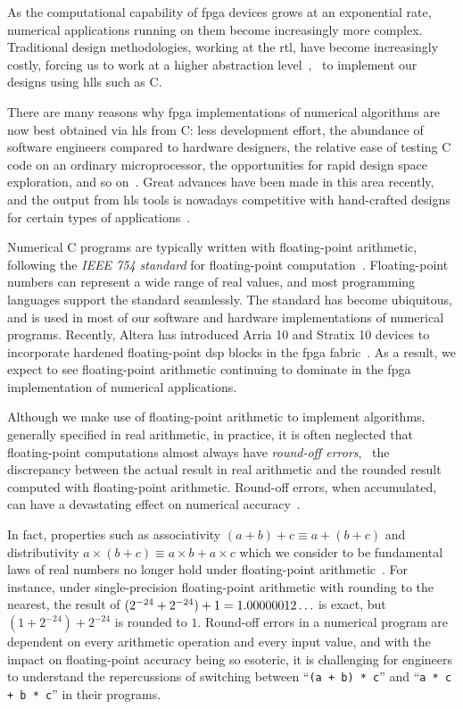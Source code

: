 As the computational capability of \gls{fpga} devices grows at an exponential
rate, numerical applications running on them become increasingly more
complex.  Traditional design methodologies, working at the \gls{rtl}, have
become increasingly costly, forcing us to work at a higher abstraction
level~\cite{gajski, bdti_xilinx, meeus12}, \eg~to implement our designs using
\glspl{hll} such as C\@.

There are many reasons why \gls{fpga} implementations of numerical algorithms
are now best obtained via \gls{hls} from C\@: less development effort, the
abundance of software engineers compared to hardware designers, the relative
ease of testing C code on an ordinary microprocessor, the opportunities
for rapid design space exploration, and so on~\cite{gajski94, meeus12,
nane15}. Great advances have been made in this area recently, and the output
from \gls{hls} tools is nowadays competitive with hand-crafted designs for
certain types of applications~\cite{bdti_xilinx}.

Numerical C programs are typically written with floating-point
arithmetic, following the \emph{IEEE 754 standard} for floating-point
computation~\cite{ieee754}.  Floating-point numbers can represent a wide
range of real values, and most programming languages support the standard
seamlessly.  The standard has become ubiquitous, and is used in most of our
software and hardware implementations of numerical programs.  Recently,
Altera has introduced Arria 10 and Stratix 10 devices to incorporate hardened
floating-point \gls{dsp} blocks in the \gls{fpga} fabric~\cite{stratix10fp}.
As a result, we expect to see floating-point arithmetic continuing to dominate
in the \gls{fpga} implementation of numerical applications.

Although we make use of floating-point arithmetic to implement algorithms,
generally specified in real arithmetic, in practice, it is often neglected that
floating-point computations almost always have \emph{round-off errors}, \ie~the
discrepancy between the actual result in real arithmetic and the rounded result
computed with floating-point arithmetic.  Round-off errors, when accumulated,
can have a devastating effect on numerical accuracy~\cite{higham02}.

In fact, properties such as associativity $(a + b) + c \equiv a + (b +
c)$ and distributivity $a \times (b + c) \equiv a \times b + a \times c$
which we consider to be fundamental laws of real numbers no longer hold
under floating-point arithmetic~\cite{goldberg}.  For instance, under
single-precision floating-point arithmetic with rounding to the nearest, the
result of $(2^{-24} + 2^{-24}) + 1 = 1.00000012\mathellipsis$ is exact, but
$(1 + 2^{-24}) + 2^{-24}$ is rounded to $1$.  Round-off errors in a numerical
program are dependent on every arithmetic operation and every input value, and
with the impact on floating-point accuracy being so esoteric, it is challenging
for engineers to understand the repercussions of switching between
``\verb|(a + b) * c|'' and ``\verb|a * c + b * c|'' in their programs.

